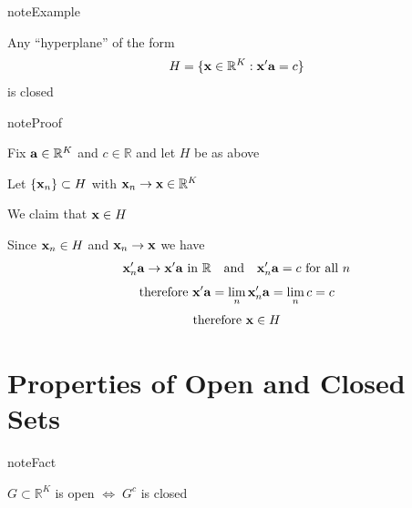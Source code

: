 \documentclass[letterpaper,10pt,english]{jupyterBook}
\begin{document}
\begin{sphinxadmonition}{note}{Example}

\sphinxAtStartPar
Any “hyperplane” of the form
\begin{equation*}
\begin{split}
H = \{ {\bf x} \in \mathbb{R}^K : {\bf x}' {\bf a} = c \}
\end{split}
\end{equation*}
\sphinxAtStartPar
is closed
\end{sphinxadmonition}

\begin{sphinxadmonition}{note}{Proof}

\sphinxAtStartPar
Fix \({\bf a} \in \mathbb{R}^K\) and \(c \in \mathbb{R}\) and let \(H\) be as above

\sphinxAtStartPar
Let \(\{{\bf x}_n\} \subset H\) with \({\bf x}_n \to {\bf x} \in \mathbb{R}^K\)

\sphinxAtStartPar
We claim that \({\bf x} \in H\)

\sphinxAtStartPar
Since \({\bf x}_n \in H\) and \({\bf x}_n \to {\bf x}\) we have
\begin{equation*}
\begin{split}
{\bf x}_n ' {\bf a} \to {\bf x}' {\bf a} \text{ in } \mathbb{R}
\quad \text{and} \quad
{\bf x}_n' {\bf a} = c \text{ for all } n
\end{split}
\end{equation*}\begin{equation*}
\begin{split}
\text{therefore } 
{\bf x}' {\bf a} = \lim_{n} {\bf x}_n' {\bf a} 
= \lim_n c
= c
\end{split}
\end{equation*}\begin{equation*}
\begin{split}
\text{therefore } 
{\bf x} \in H
\end{split}
\end{equation*}\end{sphinxadmonition}


\section{Properties of Open and Closed Sets}
\label{\detokenize{04.basic_analysis:properties-of-open-and-closed-sets}}
\begin{sphinxadmonition}{note}{Fact}

\sphinxAtStartPar
\(G \subset \mathbb{R}^K\) is open \(\iff \; G^c\) is closed
\end{sphinxadmonition}
\end{document}
